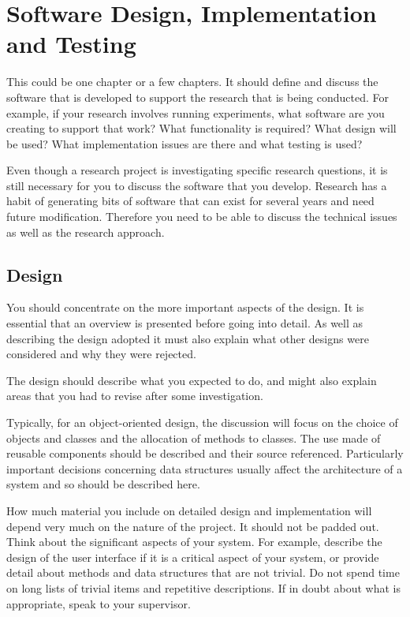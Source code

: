\chapter{Software Design, Implementation and Testing}

This could be one chapter or a few chapters. It should define and discuss the software that is developed to support the research that is being conducted. For example, if your research involves running experiments, what software are you creating to support that work? What functionality is required? What design will be used? What implementation issues are there and what testing is used? 

Even though a research project is investigating specific research questions, it is still necessary for you to discuss the software that you develop. Research has a habit of generating bits of software that can exist for several years and need future modification. Therefore you need to be able to discuss the technical issues as well as the research approach. 

\section{Design}
You should concentrate on the more important aspects of the design. It is essential that an overview is presented before going into detail. As well as describing the design adopted it must also explain what other designs were considered and why they were rejected.

The design should describe what you expected to do, and might also explain areas that you had to revise after some investigation.

Typically, for an object-oriented design, the discussion will focus on the choice of objects and classes and the allocation of methods to classes. The use made of reusable components should be described and their source referenced. Particularly important decisions concerning data structures usually affect the architecture of a system and so should be described here.

How much material you include on detailed design and implementation will depend very much on the nature of the project. It should not be padded out. Think about the significant aspects of your system. For example, describe the design of the user interface if it is a critical aspect of your system, or provide detail about methods and data structures that are not trivial. Do not spend time on long lists of trivial items and repetitive descriptions. If in doubt about what is appropriate, speak to your supervisor.
 
